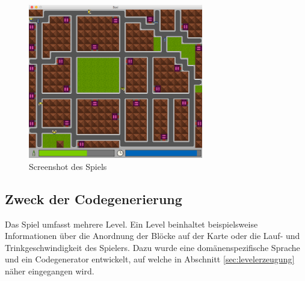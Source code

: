 \begin{figure}[]
\centering
\includegraphics[width=3in]{img/02_screenshot.png}
\caption{Screenshot des Spiels}
\label{fig:einleitung:screenshot}
\end{figure}


\subsection{Zweck der Codegenerierung}

Das Spiel umfasst mehrere Level.
Ein Level beinhaltet beispielsweise Informationen über die Anordnung der Blöcke auf der Karte oder die Lauf- und Trinkgeschwindigkeit des Spielers.
Dazu wurde eine domänenspezifische Sprache und ein Codegenerator entwickelt, auf welche in Abschnitt \ref{sec:levelerzeugung} näher eingegangen wird.